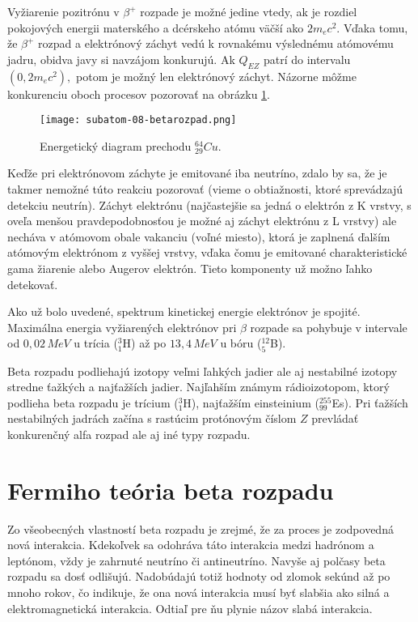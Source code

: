 \documentclass[../../main.tex]{subfiles}
\begin{document}
Vyžiarenie pozitrónu v $\beta^+$ rozpade je možné jedine vtedy, ak je rozdiel pokojových energii materského a dcérskeho atómu väčší ako $2m_ec^2$. Vďaka tomu, že $\beta^+$ rozpad a elektrónový záchyt vedú k rovnakému výslednému atómovému jadru, obidva javy si navzájom konkurujú. Ak  $Q_{EZ} $ patrí do intervalu $(0,2m_ec^2),$ potom je možný len elektrónový záchyt. Názorne môžme konkurenciu oboch procesov pozorovať na obrázku \ref{sf8:fig:betarozpad}.

\begin{figure}[!h]
\texttt{[image: subatom-08-betarozpad.png]}
\centering
\caption{Energetický diagram prechodu $^{64}_{29}Cu$.}
\label{sf8:fig:betarozpad}
\end{figure}

Keďže pri elektrónovom záchyte je emitované iba neutríno, zdalo by sa, že je takmer nemožné túto reakciu pozorovať (vieme o obtiažnosti, ktoré sprevádzajú detekciu neutrín). Záchyt elektrónu (najčastejšie sa jedná o elektrón z K vrstvy, s oveľa menšou pravdepodobnosťou je možné aj záchyt elektrónu z L vrstvy) ale necháva v atómovom obale vakanciu (voľné miesto), ktorá je zaplnená ďalším atómovým elektrónom z vyššej vrstvy, vďaka čomu je emitované charakteristické gama žiarenie alebo Augerov elektrón. Tieto komponenty už možno ľahko detekovať.

Ako už bolo uvedené, spektrum kinetickej energie elektrónov je spojité. Maximálna energia vyžiarených elektrónov pri $\beta$ rozpade sa pohybuje v intervale od $0,02\,\unit{MeV}$ u trícia ($^3_1$H) až po $13,4\,\unit{MeV}$ u bóru ($^{12}_{5}$B).

Beta rozpadu podliehajú izotopy veľmi ľahkých jadier ale aj nestabilné izotopy stredne ťažkých a najťažších jadier. Najľahším známym rádioizotopom, ktorý podlieha beta rozpadu je trícium ($^3_1$H), najťažším einsteinium ($^{255}_{99}$Es). Pri ťažších nestabilných jadrách začína s rastúcim protónovým číslom $Z$ prevládať konkurenčný alfa rozpad ale aj iné typy rozpadu.

\section{Fermiho teória beta rozpadu}
Zo všeobecných vlastností beta rozpadu je zrejmé, že za proces je zodpovedná nová interakcia. Kdekoľvek sa odohráva táto interakcia medzi hadrónom a leptónom, vždy je zahrnuté neutríno či antineutríno. Navyše aj polčasy beta rozpadu sa dosť odlišujú. Nadobúdajú totiž hodnoty od zlomok sekúnd až po mnoho rokov, čo indikuje, že ona nová interakcia musí byť slabšia ako silná a elektromagnetická interakcia. Odtiaľ pre ňu plynie názov slabá interakcia.
\end{document}
